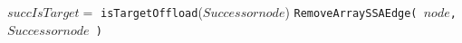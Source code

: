 \begin{algorithm}[!htbp]
\begin{algorithmic}[1]
                \State $succIsTarget =$ \texttt{isTargetOffload}($Successornode$)
                    \State \texttt{RemoveArraySSAEdge(                                                                                                                                                                                                                                                                                                                                                                                                                                                                                                                                                                                                                                                                                                                                                                                                                                                                                                                                                                                                                                                                                                                                                                                                                                                                                                                                                                                                                                                                                                                                                                                                                                                                                                                                                                                                                                                                                                                                                                                                                                                                                                                                                                                                                                                                                                                                                                                          $node$, $Successornode$ )}
                                        

\end{algorithmic}
\end{algorithm}
